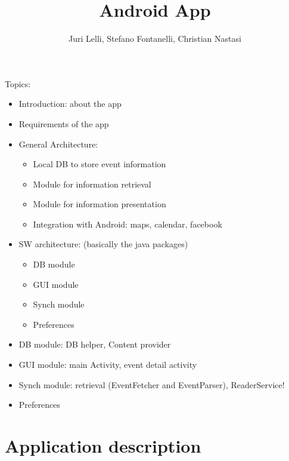\documentclass[12pt, twoside]{article}
\title{\app Android App}
\author{Juri Lelli, Stefano Fontanelli, Christian Nastasi}
\begin{document}
\maketitle

Topics:
\begin{itemize} 
    \item Introduction: about the app
    \item Requirements of the app
    \item General Architecture:
    \begin{itemize} 
        \item Local DB to store event information
        \item Module for information retrieval
        \item Module for information presentation
        \item Integration with Android: maps, calendar, facebook
    \end{itemize} 
    \item SW architecture: (basically the java packages) 
    \begin{itemize} 
        \item DB module
        \item GUI module
        \item Synch module 
        \item Preferences 
    \end{itemize} 
    \item DB module: DB helper, Content provider
    \item GUI module: main Activity, event detail activity
    \item Synch module: retrieval (EventFetcher and EventParser), ReaderService!
    \item Preferences
\end{itemize} 
\normalsize


\section{Application description}
\end{document}
